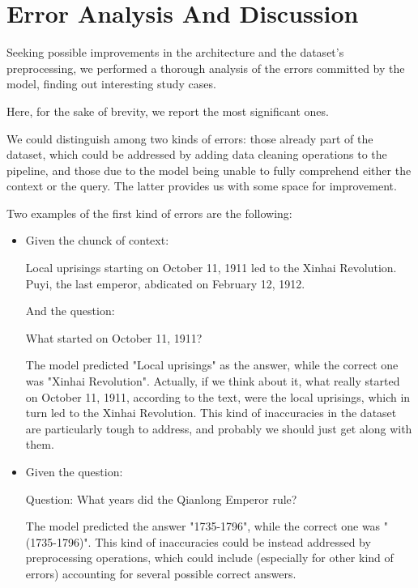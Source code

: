 \chapter{Error Analysis And Discussion}

    Seeking possible improvements in the architecture and the dataset's preprocessing, we performed a thorough analysis of the 
    errors committed by the model, finding out interesting study cases.

    Here, for the sake of brevity, we report the most significant ones.

    We could distinguish among two kinds of errors: those already part of the dataset, which could be addressed by adding 
    data cleaning operations to the pipeline, and those due to the model being unable to fully comprehend either the context or the query. The latter provides us with some space for improvement.

    Two examples of the first kind of errors are the following:

    
    \begin{itemize}
        \item 
            Given the chunck of context:
            \begin{center}
                Local uprisings starting on October 11, 1911 led to the Xinhai Revolution. Puyi, the last emperor, 
                abdicated on February 12, 1912.
            \end{center}
            
            And the question: 
            \begin{center}
                What started on October 11, 1911?
            \end{center}

            The model predicted "Local uprisings" as the answer, while the correct one was "Xinhai Revolution".
            Actually, if we think about it, what really started on October 11, 1911, according to the text, were the local uprisings, 
            which in turn led to the Xinhai Revolution. This kind of inaccuracies in the dataset are particularly tough to address, 
            and probably we should just get along with them.
        
        \item
            Given the question:
            \begin{center}
                Question:  What years did the Qianlong Emperor rule?
            \end{center}

            The model predicted the answer "1735-1796", while the correct one was "(1735-1796)". This kind of inaccuracies could be 
            instead addressed by preprocessing operations, which could include (especially for other kind of errors) accounting for 
            several possible correct answers.
    \end{itemize}

